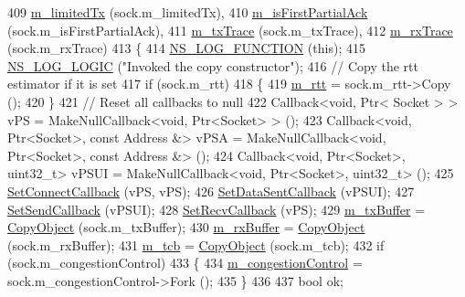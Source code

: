\begin{DoxyCode}
409     \hyperlink{classns3_1_1TcpSocketBase_a676649ad67ed68ec06a1a87a6acd6693}{m\_limitedTx} (sock.m\_limitedTx),
410     \hyperlink{classns3_1_1TcpSocketBase_ad68f7d239e22043ba999101b94770d90}{m\_isFirstPartialAck} (sock.m\_isFirstPartialAck),
411     \hyperlink{classns3_1_1TcpSocketBase_a133b5c147fbc16ef12d4788c620cca3c}{m\_txTrace} (sock.m\_txTrace),
412     \hyperlink{classns3_1_1TcpSocketBase_a27b35f098b956baf89388fff0d4e539b}{m\_rxTrace} (sock.m\_rxTrace)
413 \{
414   \hyperlink{log-macros-disabled_8h_a90b90d5bad1f39cb1b64923ea94c0761}{NS\_LOG\_FUNCTION} (\textcolor{keyword}{this});
415   \hyperlink{group__logging_ga88acd260151caf2db9c0fc84997f45ce}{NS\_LOG\_LOGIC} (\textcolor{stringliteral}{"Invoked the copy constructor"});
416   \textcolor{comment}{// Copy the rtt estimator if it is set}
417   \textcolor{keywordflow}{if} (sock.m\_rtt)
418     \{
419       \hyperlink{classns3_1_1TcpSocketBase_a5fc75bf06fd5382244cf1d60652cf58d}{m\_rtt} = sock.m\_rtt->Copy ();
420     \}
421   \textcolor{comment}{// Reset all callbacks to null}
422   Callback<void, Ptr< Socket > > vPS = MakeNullCallback<void, Ptr<Socket> > ();
423   Callback<void, Ptr<Socket>, \textcolor{keyword}{const} Address &> vPSA = MakeNullCallback<void, Ptr<Socket>, \textcolor{keyword}{const} Address &> 
      ();
424   Callback<void, Ptr<Socket>, uint32\_t> vPSUI = MakeNullCallback<void, Ptr<Socket>, uint32\_t> ();
425   \hyperlink{classns3_1_1Socket_a18935c615315a1921ea52c1b8c16be7f}{SetConnectCallback} (vPS, vPS);
426   \hyperlink{classns3_1_1Socket_a7857525a481afb48f485598a57c7f235}{SetDataSentCallback} (vPSUI);
427   \hyperlink{classns3_1_1Socket_a85ff5c8cc7d242823f301b49264c68a4}{SetSendCallback} (vPSUI);
428   \hyperlink{classns3_1_1Socket_a243f7835ef1a85f9270fd3577e3a40da}{SetRecvCallback} (vPS);
429   \hyperlink{classns3_1_1TcpSocketBase_a4a1b53982ffd851bd07ab8d5005c130e}{m\_txBuffer} = \hyperlink{classns3_1_1Object_ae13320b2910618312ecdb81e62e0cff6}{CopyObject} (sock.m\_txBuffer);
430   \hyperlink{classns3_1_1TcpSocketBase_a0163894148e5a70e6bd89970a1483fae}{m\_rxBuffer} = \hyperlink{classns3_1_1Object_ae13320b2910618312ecdb81e62e0cff6}{CopyObject} (sock.m\_rxBuffer);
431   \hyperlink{classns3_1_1TcpSocketBase_a26bbaf59001308dc43fb630d76f2e38b}{m\_tcb} = \hyperlink{classns3_1_1Object_ae13320b2910618312ecdb81e62e0cff6}{CopyObject} (sock.m\_tcb);
432   \textcolor{keywordflow}{if} (sock.m\_congestionControl)
433     \{
434       \hyperlink{classns3_1_1TcpSocketBase_a090719d52b06a791341e2fefa5e12c3e}{m\_congestionControl} = sock.m\_congestionControl->Fork ();
435     \}
436 
437   \textcolor{keywordtype}{bool} ok;

\end{DoxyCode}
